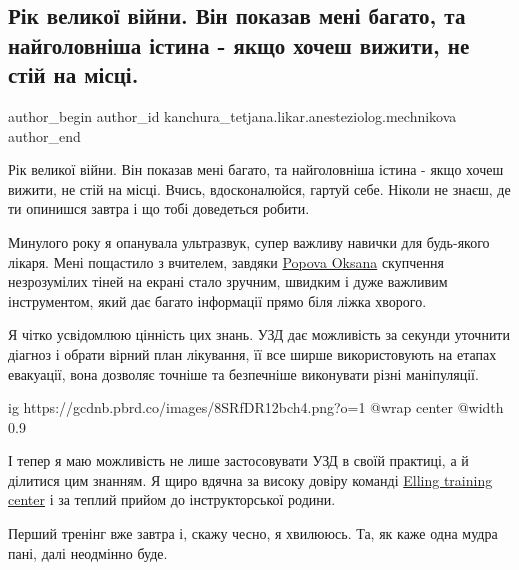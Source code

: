  
 
 
 
 

\subsection{Рік великої війни. Він показав мені багато, та найголовніша істина - якщо хочеш вижити, не стій на місці.}
\label{sec:24_02_2023.fb.kanchura_tetjana.likar.anesteziolog.mechnikova.1.rik_velykoj_vijny}

\ifcmt
 author_begin
   author_id kanchura_tetjana.likar.anesteziolog.mechnikova
 author_end
\fi

Рік великої війни. Він показав мені багато, та найголовніша істина - якщо хочеш
вижити, не стій на місці. Вчись, вдосконалюйся, гартуй себе. Ніколи не знаєш,
де ти опинишся завтра і що тобі доведеться робити.

Минулого року я опанувала ультразвук, супер важливу навички для будь-якого
лікаря. Мені пощастило з вчителем, завдяки
\href{https://www.facebook.com/profile.php?id=100009725195143}{Popova Oksana}
скупчення незрозумілих тіней на екрані стало зручним, швидким і дуже важливим
інструментом, який дає багато інформації прямо біля ліжка хворого. 

Я чітко усвідомлюю цінність цих знань. УЗД дає можливість за секунди уточнити
діагноз і обрати вірний план лікування, її все ширше використовують на етапах
евакуації, вона дозволяє точніше та безпечніше виконувати різні маніпуляції.

\ifcmt
  ig https://gcdnb.pbrd.co/images/8SRfDR12bch4.png?o=1
  @wrap center
  @width 0.9
\fi

І тепер я маю можливість не лише застосовувати УЗД в своїй практиці, а й
ділитися цим знанням. Я щиро вдячна за високу довіру команді \href{https://www.facebook.com/ellingtrainingcenter}{Elling training
center} і за теплий прийом до інструкторської родини. 

Перший тренінг вже завтра і, скажу чесно, я хвилююсь. Та, як каже одна мудра
пані, далі неодмінно буде.
